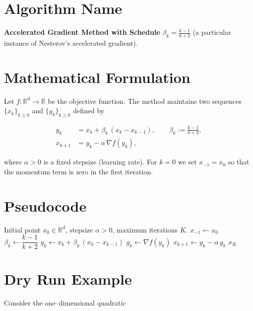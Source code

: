 \documentclass{article}
\newcommand{\grad}{\nabla}
\newcommand{\R}{\mathbb{R}}
\begin{document}
\section*{Algorithm Name}
\textbf{Accelerated Gradient Method with Schedule }$\displaystyle 
\beta_k=\frac{k-1}{k+2}$ \quad (a particular instance of Nesterov’s
accelerated gradient).

\section*{Mathematical Formulation}
Let $f:\R^d\rightarrow\R$ be the objective function.  
The method maintains two sequences $\{x_k\}_{k\ge 0}$ and
$\{y_k\}_{k\ge 0}$ defined by  

\[
\boxed{
\begin{aligned}
y_k &= x_k + \beta_k\,(x_k-x_{k-1}), \qquad\beta_k:=\frac{k-1}{k+2},
\\[4pt]
x_{k+1} &= y_k-\alpha\,\grad f(y_k),
\end{aligned}}
\tag{1}
\]

where $\alpha>0$ is a fixed stepsize (learning rate).  
For $k=0$ we set $x_{-1}=x_0$ so that the momentum term is zero in the
first iteration.

\section*{Pseudocode}
\begin{algorithm}[H]
\caption{Accelerated Gradient with $\beta_k=\frac{k-1}{k+2}$}
\begin{algorithmic}[1]
\Require Initial point $x_0\in\R^d$, stepsize $\alpha>0$,
        maximum iterations $K$.
\State $x_{-1}\gets x_0$ 
    \State $\beta_k \gets \dfrac{k-1}{k+2}$ 
    \State $y_k \gets x_k + \beta_k\,(x_k-x_{k-1})$ 
    \State $g_k \gets \grad f(y_k)$
    \State $x_{k+1} \gets y_k - \alpha\,g_k$ 
\EndFor
\State \Return $x_K$
\end{algorithmic}
\end{algorithm}

\section*{Dry Run Example}
Consider the one–dimensional quadratic  
\end{document}
